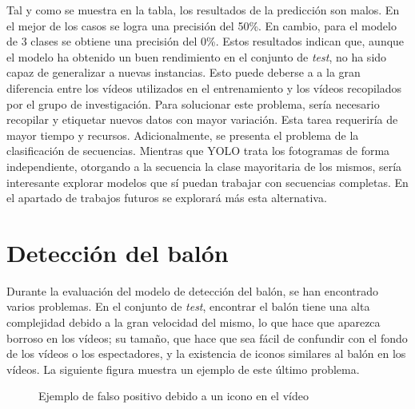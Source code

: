 \documentclass[12pt]{report} %
\begin{document}
    Tal y como se muestra en la tabla, los resultados de la predicción son
    malos. En el mejor de los casos se logra una precisión del 50\%. En cambio,
    para el modelo de 3 clases se obtiene una precisión del 0\%. Estos
    resultados indican que, aunque el modelo ha obtenido un buen rendimiento en
    el conjunto de \textit{test}, no ha sido capaz de generalizar a nuevas
    instancias. Esto puede deberse a a la gran diferencia entre los vídeos
    utilizados en el entrenamiento y los vídeos recopilados por el grupo de
    investigación. Para solucionar este problema, sería necesario recopilar y
    etiquetar nuevos datos con mayor variación. Esta tarea requeriría de mayor
    tiempo y recursos. Adicionalmente, se presenta el problema de la
    clasificación de secuencias. Mientras que YOLO trata los fotogramas de
    forma independiente, otorgando a la secuencia la clase mayoritaria de los
    mismos, sería interesante explorar modelos que sí puedan trabajar con
    secuencias completas. En el apartado de trabajos futuros se explorará más
    esta alternativa.

    \section{Detección del balón}

    Durante la evaluación del modelo de detección del balón, se han encontrado
    varios problemas. En el conjunto de \textit{test}, encontrar el balón tiene
    una alta complejidad debido a la gran velocidad del mismo, lo que hace que
    aparezca borroso en los vídeos; su tamaño, que hace que sea fácil de
    confundir con el fondo de los vídeos o los espectadores, y la existencia de
    iconos similares al balón en los vídeos. La siguiente figura muestra un
    ejemplo de este último problema.

    \begin{figure}[H]
        \centering
        \caption{Ejemplo de falso positivo debido a un icono en el vídeo}
    \end{figure}
\end{document}
